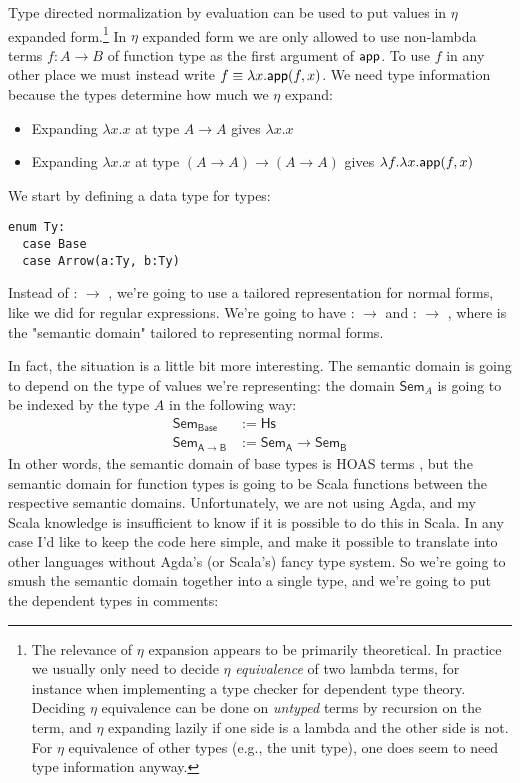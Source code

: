 Type directed normalization by evaluation can be used to put values in $\eta$ expanded form.\footnote{
  The relevance of $\eta$ expansion appears to be primarily theoretical.
  In practice we usually only need to decide $\eta$ \emph{equivalence} of two lambda terms, for instance when implementing a type checker for dependent type theory.
  Deciding $\eta$ equivalence can be done on \emph{untyped} terms by recursion on the term, and $\eta$ expanding lazily if one side is a lambda and the other side is not.
  For $\eta$ equivalence of other types (e.g., the unit type), one does seem to need type information anyway.
}
In $\eta$ expanded form we are only allowed to use non-lambda terms $f : A \to B$ of function type as the first argument of $\mathsf{app}$.
To use $f$ in any other place we must instead write $f \equiv \lambda x. \mathsf{app}(f,x)$.
We need type information because the types determine how much we $\eta$ expand:
\begin{itemize}
  \item Expanding $\lambda x. x$ at type $A \to A$ gives $\lambda x. x$
  \item Expanding $\lambda x. x$ at type $(A \to A) \to (A \to A)$ gives $\lambda f. \lambda x. \mathsf{app}(f,x)$
\end{itemize}

We start by defining a data type for types:

\begin{lstlisting}
enum Ty:
  case Base
  case Arrow(a:Ty, b:Ty)
\end{lstlisting}

Instead of  :  $\to$ , we're going to use a tailored representation for normal forms, like we did for regular expressions.
We're going to have  :  $\to$  and  :  $\to$ , where  is the "semantic domain" tailored to representing normal forms.

In fact, the situation is a little bit more interesting.
The semantic domain is going to depend on the type of values we're representing: the domain $\mathsf{Sem}_A$ is going to be indexed by the type $A$ in the following way:
\begin{align*}
  \mathsf{Sem}_\mathsf{Base} &:= \mathsf{Hs} \\
  \mathsf{Sem}_{\mathsf{A} \to \mathsf{B}} &:= \mathsf{Sem}_\mathsf{A} \to \mathsf{Sem}_\mathsf{B}
\end{align*}
In other words, the semantic domain of base types is HOAS terms , but the semantic domain for function types is going to be Scala functions between the respective semantic domains.
Unfortunately, we are not using Agda, and my Scala knowledge is insufficient to know if it is possible to do this in Scala.
In any case I'd like to keep the code here simple, and make it possible to translate into other languages without Agda's (or Scala's) fancy type system.
So we're going to smush the semantic domain together into a single type, and we're going to put the dependent types in comments:

